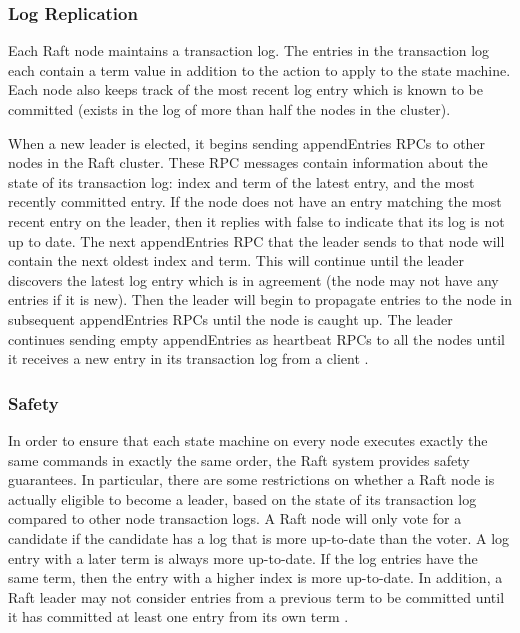 \documentclass[conference,compsoc]{./IEEEtran/IEEEtran}
\begin{document}
\subsubsection{Log Replication}

Each Raft node maintains a transaction log. The entries in the
transaction log each contain a term value in addition to the action to
apply to the state machine. Each node also keeps track of the most
recent log entry which is known to be committed (exists in the log of
more than half the nodes in the cluster).

When a new leader is elected, it begins sending appendEntries RPCs
to other nodes in the Raft cluster. These RPC messages contain
information about the state of its transaction log: index and term of
the latest entry, and the most recently committed entry. If the node
does not have an entry matching the most recent entry on the leader,
then it replies with false to indicate that its log is not up to
date. The next appendEntries RPC that the leader sends to that
node will contain the next oldest index and term. This will continue
until the leader discovers the latest log entry which is in agreement
(the node may not have any entries if it is new). Then the leader will
begin to propagate entries to the node in subsequent appendEntries
RPCs until the node is caught up. The leader continues sending
empty appendEntries as heartbeat RPCs to all the nodes until it
receives a new entry in its transaction log from a client
\cite[Section~3.5]{raft_thesis:ongaro14}.

\subsubsection{Safety}

In order to ensure that each state machine on every node executes
exactly the same commands in exactly the same order, the Raft system
provides safety guarantees. In particular, there are some restrictions
on whether a Raft node is actually eligible to become a leader, based on
the state of its transaction log compared to other node transaction
logs. A Raft node will only vote for a candidate if the candidate has
a log that is more up-to-date than the voter. A log entry with a later
term is always more up-to-date. If the log entries have the same term,
then the entry with a higher index is more up-to-date. In addition,
a Raft leader may not consider entries from a previous term to be
committed until it has committed at least one entry from its own
term
\cite[Section~3.6]{raft_thesis:ongaro14}.
\end{document}
